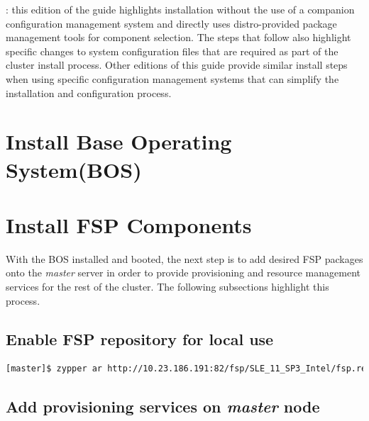\documentclass[letterpaper]{article}
\begin{document}
: this edition of the guide highlights
installation without the use of a companion configuration management system and
directly uses distro-provided package management tools for component
selection. The steps that follow also highlight specific changes to system
configuration files that are required as part of the cluster install
process. Other editions of this guide provide similar install steps when using
specific configuration management systems that can simplify the installation
and configuration process. \\





\section{Install Base Operating System(BOS)}



\section{Install FSP Components}

With the BOS installed and booted, the next step is to add desired FSP packages
onto the {\em master} server in order to provide provisioning and resource
management services for the rest of the cluster. The following subsections
highlight this process.

\subsection{Enable FSP repository for local use}


\vspace*{0.2cm}
\begin{lstlisting}[language=bash]
[master]$ zypper ar http://10.23.186.191:82/fsp/SLE_11_SP3_Intel/fsp.repo 
\end{lstlisting}


\subsection{Add provisioning services on {\em master} node}
\end{document}
